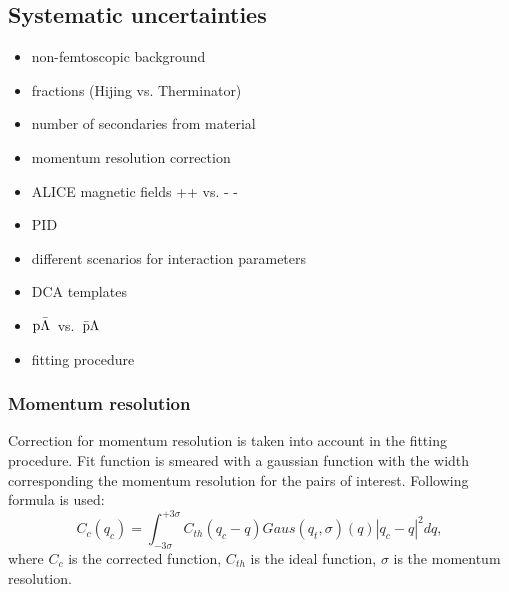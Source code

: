 \documentclass[ALICE,manyauthors]{ALICE_analysis_notes}
\newcommand{\pal}{$\rm p\bar{\rm \Lambda}$}
\newcommand{\apl}{$\bar{\rm p }\Lambda$}
\begin{document}
\subsection{Systematic uncertainties}
\begin{itemize}
\item non-femtoscopic background
\item fractions (Hijing vs. Therminator)
\item number of secondaries from material
\item momentum resolution correction
\item ALICE magnetic fields ++ vs. - - 
\item PID
\item different scenarios for interaction parameters
\item DCA templates
\item \pal~vs.~\apl
\item fitting procedure    
\end{itemize}

\subsubsection{Momentum resolution}
Correction for momentum resolution is taken into account in the fitting procedure. Fit function is smeared with a gaussian function with the width corresponding the momentum resolution for the pairs of interest. Following formula is used:
\begin{equation}
  C_c(q_c) = \int_{-3\sigma}^{+3\sigma}C_{th}(q_c-q) Gaus(q_t, \sigma)(q) |q_c-q|^2 d q,
\end{equation}
where $C_c$ is the corrected function, $C_{th}$ is the ideal function, $\sigma$ is the momentum resolution.


\end{document}
